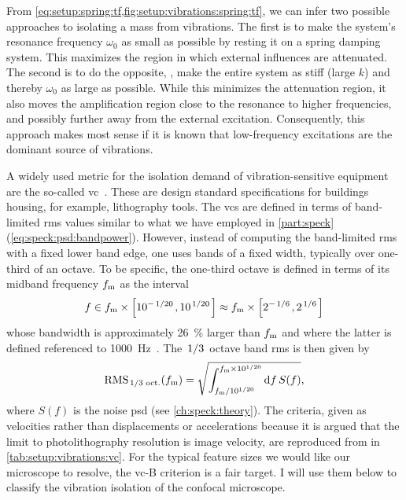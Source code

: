 From \cref{eq:setup:spring:tf,fig:setup:vibrations:spring:tf}, we can infer two possible approaches to isolating a mass from vibrations.
The first is to make the system's resonance frequency $\omega_0$ as small as possible by resting it on a spring damping system.
This maximizes the region in which external influences are attenuated.
The second is to do the opposite, \ie, make the entire system as stiff (large $k$) and thereby $\omega_0$ as large as possible.
While this minimizes the attenuation region, it also moves the amplification region close to the resonance to higher frequencies, and possibly further away from the external excitation.
Consequently, this approach makes most sense if it is known that low-frequency excitations are the dominant source of vibrations.

A widely used metric for the isolation demand of vibration-sensitive equipment are the so-called \gls{vc}~\cite{Gordon1992,Gordon1999}.
These are design standard specifications for buildings housing, for example, lithography tools.
The \glspl{vc} are defined in terms of band-limited \gls{rms} values similar to what we have employed in \cref{part:speck} (\cf \cref{eq:speck:psd:bandpower}).
However, instead of computing the band-limited \gls{rms} with a fixed lower band edge, one uses bands of a fixed width, typically over one-third of an octave.
To be specific, the one-third octave is defined in terms of its midband frequency $f_{\mathrm{m}}$ as the interval
\begin{equation}\label{eq:setup:vibrations:third_octave}
    f\in f_{\mr{m}}\times\left[10^{-\flatfrac{1}{20}},10^{\flatfrac{1}{20}}\right] \approx f_{\mr{m}}\times\left[2^{-\flatfrac{1}{6}},2^{\flatfrac{1}{6}}\right]
\end{equation}
whose bandwidth \df is approximately \qty{26}{\percent} larger than $f_{\mathrm{m}}$ and where the latter is defined referenced to \qty{1000}{\hertz}~\cite{ansi_octave_bands}.
The $\flatfrac{1}{3}$ octave band \gls{rms} is then given by
\begin{equation}\label{eq:setup:vibrations:octave_band_rms}
    \rms_{\flatfrac{1}{3}\,\mr{oct.}}(f_{\mr{m}}) = \sqrt{\int_{f_{\mr{m}}/10^{1/20}}^{f_{\mr{m}}\times 10^{1/20}}\dd{f}S(f)},
\end{equation}
where $S(f)$ is the noise \gls{psd} (see \cref{ch:speck:theory}).
The criteria, given as velocities rather than displacements or accelerations because it is argued that the limit to photolithography resolution is image velocity, are reproduced from  in \cref{tab:setup:vibrations:vc}.
For the typical feature sizes we would like our microscope to resolve, the \acrshort{vc}-B criterion is a fair target.
I will use them below to classify the vibration isolation of the confocal microscope.

